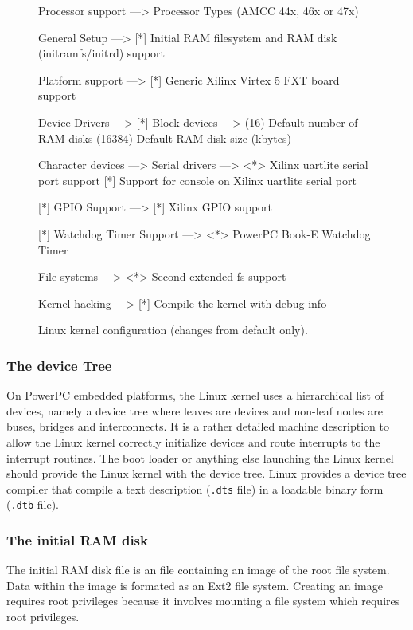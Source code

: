 \begin{figure}[p]
\begin{center}
\begin{script}
Processor support  --->
        Processor Types (AMCC 44x, 46x or 47x)

General Setup  --->
    [*] Initial RAM filesystem and RAM disk (initramfs/initrd) support

Platform support  --->
    [*] Generic Xilinx Virtex 5 FXT board support

Device Drivers  --->
    [*] Block devices  --->
        (16)    Default number of RAM disks
         (16384) Default RAM disk size (kbytes)

        Character devices  --->
            Serial drivers  --->
                <*> Xilinx uartlite serial port support
                [*]   Support for console on Xilinx uartlite serial port

    [*] GPIO Support  --->
        [*] Xilinx GPIO support

    [*] Watchdog Timer Support  --->
        <*> PowerPC Book-E Watchdog Timer

File systems  --->
    <*> Second extended fs support

Kernel hacking  --->
    [*] Compile the kernel with debug info
\end{script}
\end{center}
\caption{Linux kernel configuration (changes from default only).}
\label{fig:kernel_configuration}
\end{figure}



\subsubsection{The device Tree}

On PowerPC embedded platforms, the Linux kernel uses a hierarchical list of devices, namely a device tree where leaves are devices and non-leaf nodes are buses, bridges and interconnects.
It is a rather detailed machine description to allow the Linux kernel correctly initialize devices and route interrupts to the interrupt routines.
The boot loader or anything else launching the Linux kernel should provide the Linux kernel with the device tree.
Linux provides a device tree compiler that compile a text description (\texttt{.dts} file) in a loadable binary form (\texttt{.dtb} file).

\subsubsection{The initial RAM disk}
The initial RAM disk file is an file containing an image of the root file system.
Data within the image is formated as an Ext2 file system.
Creating an image requires root privileges because it involves mounting a file system which requires root privileges.

